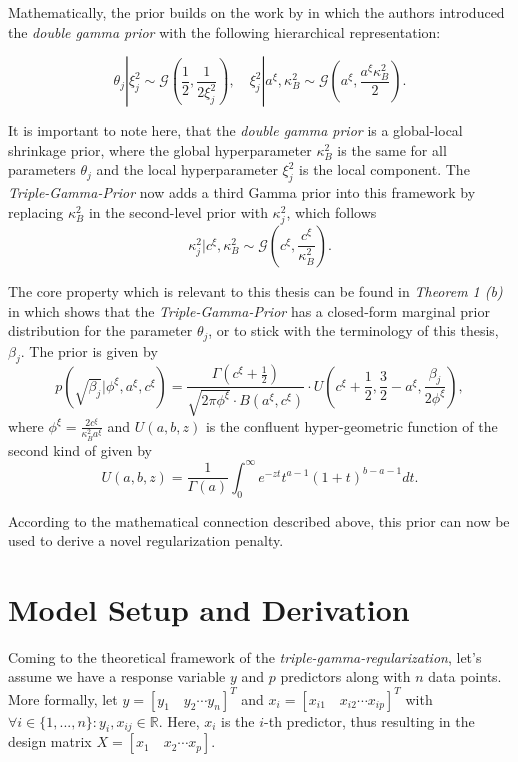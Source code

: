 \documentclass[12pt,a4paper]{article}
\begin{document}
Mathematically, the prior builds on the work by \textcite{BittoFS2019} in which the authors introduced the \textit{double gamma prior} with the following hierarchical representation:

$$\theta_j|\xi^2_j \sim \mathcal{G}\left(\frac{1}{2}, \frac{1}{2\xi^2_j} \right), \quad \xi^2_j | a^\xi, \kappa^2_B \sim \mathcal{G}\left(a^\xi, \frac{a^\xi\kappa_B^2}{2}\right).$$

It is important to note here, that the \textit{double gamma prior} is a global-local shrinkage prior, where the global hyperparameter $\kappa^2_B$ is the same for all parameters $\theta_j$ and the local hyperparameter $\xi^2_j$ is the local component. The \textit{Triple-Gamma-Prior} now adds a third Gamma prior into this framework by replacing $\kappa_B^2$ in the second-level prior with $\kappa_j^2$, which follows
$$\kappa_j^2 | c^\xi, \kappa_B^2 \sim \mathcal{G}\left(c^\xi, \frac{c^\xi}{\kappa_B^2}\right).$$ 

The core property which is relevant to this thesis can be found in \textit{Theorem 1 (b)} in \textcite{TGP2020} which shows that the \textit{Triple-Gamma-Prior} has a closed-form marginal prior distribution for the parameter $\theta_j$, or to stick with the terminology of this thesis, $\beta_j$. The prior is given by
$$p(\sqrt{\beta_j}|\phi^\xi, a^\xi, c^\xi) = \frac{\Gamma(c^\xi + \frac{1}{2})}{\sqrt{2\pi \phi^\xi}\cdot B(a^\xi, c^\xi)}\cdot U\left(c^\xi + \frac{1}{2}, \frac{3}{2}-a^\xi, \frac{\beta_j}{2\phi^\xi}\right),$$
where $\phi^\xi = \frac{2c^\xi}{\kappa^2_Ba^\xi}$ and $U(a,b,z)$ is the confluent hyper-geometric function of the second kind of \textcite{Tricomi1947} given by
$$U(a,b,z) = \frac{1}{\Gamma(a)}\int_0^\infty e^{-zt}t^{a-1}(1+t)^{b-a-1}dt.$$

According to the mathematical connection described above, this prior can now be used to derive a novel regularization penalty.


\newpage
\section{Model Setup and Derivation}\label{sec:modelderivation}
Coming to the theoretical framework of the \textit{triple-gamma-regularization}, let's assume we have a response variable $y$ and $p$ predictors along with $n$ data points. More formally, let $y=[y_1  \quad y_2 \cdots y_n]^T$ and $x_i = [x_{i1} \quad x_{i2} \cdots x_{ip}]^T$ with $\forall i\in \{1,...,n\}: y_i, x_{ij} \in \mathbb{R}$. Here, $x_i$ is the $i$-th predictor, thus resulting in the design matrix $X = [x_1 \quad x_2 \cdots x_p]$.\\
\end{document}

